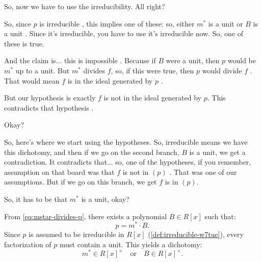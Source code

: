 \begin{proofWrapper}
\begin{speech}[00:31:52 - 00:33:44]
So, now we have to use the irreducibility. All right?

So, since $p$ is irreducible , this implies one of these: so, either $m^*$ is a unit or $B$ is a unit . Since it's irreducible, you have to use it's irreducible now. So, one of these is true.

And the claim is... this is impossible . Because if $B$ were a unit, then $p$ would be $m^*$ up to a unit. But $m^*$ divides $f$, so, if this were true, then $p$ would divide $f$ . That would mean $f$ is in the ideal generated by $p$ .

But our hypothesis is exactly $f$ is not in the ideal generated by $p$. This contradicts that hypothesis .

Okay?

So, here's where we start using the hypotheses. So, irreducible means we have this dichotomy, and then if we go on the second branch, $B$ is a unit, we get a contradiction. It contradicts that... so, one of the hypotheses, if you remember, assumption on that board was that $f$ is not in $(p)$ . That was one of our assumptions. But if we go on this branch, we get $f$ is in $(p)$.

So, it has to be that $m^*$ is a unit, okay? 
\end{speech}

\begin{content}
From \eqref{eq:mstar-divides-p}, there exists a polynomial $B \in R[x]$ such that:
\begin{equation}\label{eq:p-eq-mstar-B}
p = m^* \cdot B.
\end{equation}
Since $p$ is assumed to be irreducible in $R[x]$ (\cref{def:irreducible-w7tue}), every factorization of $p$ must contain a unit. This yields a dichotomy:
\[
m^* \in R[x]^\times \quad \text{or} \quad B \in R[x]^\times.
\]


\end{content}
\end{proofWrapper}
